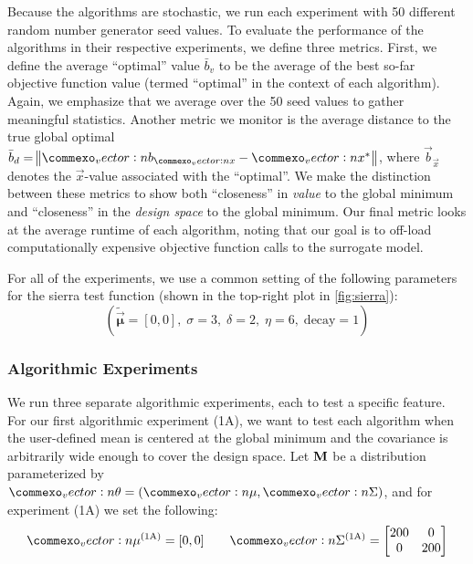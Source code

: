 Because the algorithms are stochastic, we run each experiment with 50 different random number generator seed values.
To evaluate the performance of the algorithms in their respective experiments, we define three metrics.
First, we define the average ``optimal'' value $\bar{b}_v$ to be the average of the best so-far objective function value (termed ``optimal'' in the context of each algorithm). Again, we emphasize that we average over the 50 seed values to gather meaningful statistics.
Another metric we monitor is the average distance to the true global optimal $\bar{b}_d = \norm{\vec{b}_{\vec{x}} - \vec{x}^*}$, where $\vec{b}_{\vec{x}}$ denotes the $\vec{x}$-value associated with the ``optimal''.
We make the distinction between these metrics to show both ``closeness'' in \textit{value} to the global minimum and ``closeness'' in the \textit{design space} to the global minimum.
Our final metric looks at the average runtime of each algorithm, noting that our goal is to off-load computationally expensive objective function calls to the surrogate model.

For all of the experiments, we use a common setting of the following parameters for the sierra test function (shown in the top-right plot in \cref{fig:sierra}):
\begin{equation*}
    (\mathbf{\tilde{\vec{\mu}}} =[0,0],\; \sigma=3,\; \delta=2,\; \eta=6,\; \text{decay} = 1)
\end{equation*}


\subsubsection{Algorithmic Experiments} \label{sec:alg_experiments}
We run three separate algorithmic experiments, each to test a specific feature.
For our first algorithmic experiment (1A), we want to test each algorithm when the user-defined mean is centered at the global minimum and the covariance is arbitrarily wide enough to cover the design space.
Let $\mathbf{M}$ be a distribution parameterized by $\vec{\theta} = (\vec{\mu}, \mat{\Sigma})$, and for experiment (1A) we set the following:
\begin{equation*}
    \vec\mu^{(\text{1A})} = [0, 0] \qquad
    \mat\Sigma^{(\text{1A})} = \begin{bmatrix}
        200 & 0\\
        0 & 200
    \end{bmatrix}
\end{equation*}

